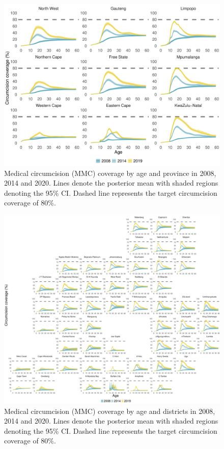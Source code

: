 \documentclass{article}
\begin{document}
\begin{appendix}
\begin{figure}[H]
	\centering
	\includegraphics[width = \linewidth]{Figures/suppmat/Coverage/MMCcoverage_SingleAge_Province.pdf}
	\caption{Medical circumcision (MMC) coverage by age and province in 2008, 2014 and 2020. Lines denote the posterior mean with shaded regions denoting the 95\% CI. Dashed line represents the target circumcision coverage of 80\%.}
\end{figure}	


\begin{figure}[H]
	\centering
	\includegraphics[width = \linewidth]{Figures/suppmat/Coverage/MMCcoverage_SingleAge_District.pdf}
	\caption{Medical circumcision (MMC) coverage by age and districts in 2008, 2014 and 2020. Lines denote the posterior mean with shaded regions denoting the 95\% CI. Dashed line represents the target circumcision coverage of 80\%.}
\end{figure}	


\end{appendix}
\end{document}
